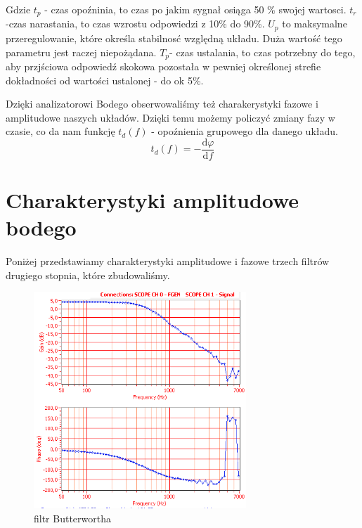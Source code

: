 \documentclass[a4paper,11pt]{article}
\begin{document}
Gdzie $t_p$ - czas opoźninia, to czas po jakim sygnał osiąga 50 \% swojej wartosci. $ t_r$ -czas narastania, to czas wzrostu odpowiedzi z 10\% do 90\%.   $U_p$ to maksymalne przeregulowanie, które określa stabilnosć względną układu. Duża wartość tego parametru jest raczej niepożądana. $T_p $- czas ustalania, to czas potrzebny do tego, aby przjściowa odpowiedź skokowa pozostała w pewniej określonej strefie dokładności od wartości ustalonej - do ok 5\%. 

Dzięki analizatorowi Bodego obserwowaliśmy też charakerystyki fazowe i amplitudowe naszych układów. Dzięki temu możemy policzyć zmiany fazy w czasie, co da nam funkcję $t_d(f)$ - opoźnienia grupowego dla danego układu.  
$$ t_d(f) = - \frac {\mbox{d}\varphi } {\mbox{d}f} $$ 




\section{Charakterystyki amplitudowe bodego}

Poniżej przedstawiamy charakterystyki amplitudowe i fazowe trzech filtrów drugiego stopnia, które zbudowaliśmy.

\begin{figure}[H]
\begin{center}
\includegraphics[width=8cm]{obrazki/batman1.PNG}
\end{center}
\caption{filtr Butterwortha}
\end{figure}
\end{document}
